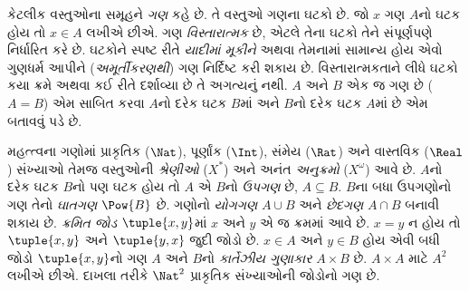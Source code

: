 કેટલીક વસ્તુઓના સમૂહને \emph{ગણ} કહે છે. તે વસ્તુઓ ગણના ઘટકો છે. જો $x$ ગણ $A$નો ઘટક હોય તો $x \in A$ લખીએ છીએ. ગણ \emph{વિસ્તારાત્મક} છે, એટલે તેના ઘટકો તેને સંપૂર્ણપણે નિર્ધારિત કરે છે. ઘટકોને સ્પષ્ટ રીતે \emph{યાદીમાં મૂકીને} અથવા તેમનામાં સામાન્ય હોય એવો ગુણધર્મ આપીને (\emph{અમૂર્તીકરણથી}) ગણ નિર્દિષ્ટ કરી શકાય છે. વિસ્તારાત્મકતાને લીધે ઘટકો કયા ક્રમે અથવા કઈ રીતે દર્શાવ્યા છે તે અગત્યનું નથી. $A$ અને $B$ એક જ ગણ છે ($A=B$) એમ સાબિત કરવા $A$નો દરેક ઘટક $B$માં અને $B$નો દરેક ઘટક $A$માં છે એમ બતાવવું પડે છે.

મહત્ત્વના ગણોમાં પ્રાકૃતિક ($\Nat$), પૂર્ણાંક ($\Int$), સંમેય ($\Rat$) અને વાસ્તવિક ($\Real$) સંખ્યાઓ તેમજ વસ્તુઓની \emph{શ્રેણીઓ} ($X^*$) અને અનંત \emph{અનુક્રમો} ($X^\omega$) આવે છે. $A$નો દરેક ઘટક $B$નો પણ ઘટક હોય તો $A$ એ $B$નો \emph{ઉપગણ} છે, $A\subseteq B$. $B$ના બધા ઉપગણોનો ગણ તેનો \emph{ઘાતગણ} $\Pow{B}$ છે. ગણોનો \emph{યોગગણ} $A\cup B$ અને \emph{છેદગણ} $A\cap B$ બનાવી શકાય છે. \emph{ક્રમિત જોડ} $\tuple{x,y}$માં $x$ અને $y$ એ જ ક્રમમાં આવે છે. $x=y$ ન હોય તો $\tuple{x,y}$ અને $\tuple{y,x}$ જુદી જોડો છે. $x\in A$ અને $y\in B$ હોય એવી બધી જોડો $\tuple{x,y}$નો ગણ $A$ અને $B$નો \emph{કાર્તેઝીય ગુણાકાર} $A\times B$ છે. $A\times A$ માટે $A^2$ લખીએ છીએ. દાખલા તરીકે $\Nat^2$ પ્રાકૃતિક સંખ્યાઓની જોડોનો ગણ છે.
